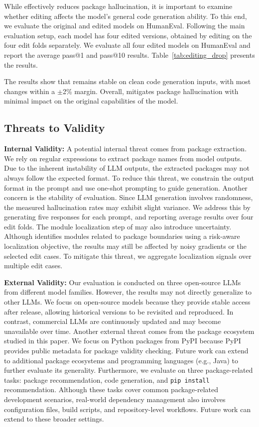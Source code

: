 While \appname effectively reduces package hallucination, it is important to examine whether editing affects the model's general code generation ability. 
To this end, we evaluate the original and edited models on HumanEval. 
Following the main evaluation setup, each model has four edited versions, obtained by editing on the four edit folds separately. 
We evaluate all four edited models on HumanEval and report the average pass@1 and pass@10 results. 
Table~\ref{tab:editing_drop} presents the results.

The results show that \appname remains stable on clean code generation inputs, with most changes within a $\pm$2\% margin. 
Overall, \appname mitigates package hallucination with minimal impact on the original capabilities of the model.


\subsection{Threats to Validity}
\noindent\textbf{Internal Validity:}
A potential internal threat comes from package extraction. 
We rely on regular expressions to extract package names from model outputs. 
Due to the inherent instability of LLM outputs, the extracted packages may not always follow the expected format. 
To reduce this threat, we constrain the output format in the prompt and use one-shot prompting to guide generation.
Another concern is the stability of evaluation. 
Since LLM generation involves randomness, the measured hallucination rates may exhibit slight variance. 
We address this by generating five responses for each prompt, and reporting average results over four edit folds.
The module localization step of \appname may also introduce uncertainty. 
Although \appname identifies modules related to package boundaries using a risk-aware localization objective, the results may still be affected by noisy gradients or the selected edit cases. 
To mitigate this threat, we aggregate localization signals over multiple edit cases. 

\noindent\textbf{External Validity:}
Our evaluation is conducted on three open-source LLMs from different model families. However, the results may not directly generalize to other LLMs. We focus on open-source models because they provide stable access after release, allowing historical versions to be revisited and reproduced. In contrast, commercial LLMs are continuously updated and may become unavailable over time.
Another external threat comes from the package ecosystem studied in this paper. 
We focus on Python packages from PyPI because PyPI provides public metadata for package validity checking. 
Future work can extend \appname to additional package ecosystems and programming languages (e.g., Java) to further evaluate its generality.
Furthermore, we evaluate \appname on three package-related tasks: package recommendation, code generation, and \texttt{pip install} recommendation. Although these tasks cover common package-related development scenarios, real-world dependency management also involves configuration files, build scripts, and repository-level workflows. Future work can extend \appname to these broader settings.